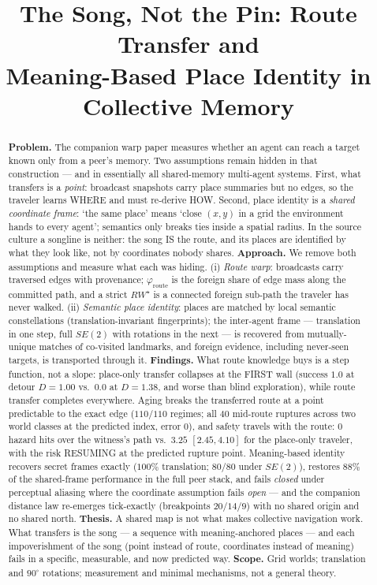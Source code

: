 \documentclass{article}
\title{The Song, Not the Pin: Route Transfer and\\Meaning-Based Place Identity in Collective Memory}
\newcommand{\rwstar}{RW^{\star}}
\newcommand{\phiroute}{\varphi_{\mathrm{route}}}
\begin{document}
\maketitle

\begin{abstract}
\textbf{Problem.} The companion warp paper measures whether an agent can reach a target known only from a peer's memory. Two assumptions remain hidden in that construction --- and in essentially all shared-memory multi-agent systems. First, what transfers is a \emph{point}: broadcast snapshots carry place summaries but no edges, so the traveler learns WHERE and must re-derive HOW. Second, place identity is a \emph{shared coordinate frame}: `the same place' means `close $(x,y)$ in a grid the environment hands to every agent'; semantics only breaks ties inside a spatial radius. In the source culture a songline is neither: the song IS the route, and its places are identified by what they look like, not by coordinates nobody shares.
\textbf{Approach.} We remove both assumptions and measure what each was hiding. (i) \emph{Route warp}: broadcasts carry traversed edges with provenance; $\phiroute$ is the foreign share of edge mass along the committed path, and a strict $\rwstar$ is a connected foreign sub-path the traveler has never walked. (ii) \emph{Semantic place identity}: places are matched by local semantic constellations (translation-invariant fingerprints); the inter-agent frame --- translation in one step, full $SE(2)$ with rotations in the next --- is recovered from mutually-unique matches of co-visited landmarks, and foreign evidence, including never-seen targets, is transported through it.
\textbf{Findings.} What route knowledge buys is a step function, not a slope: place-only transfer collapses at the FIRST wall (success $1.0$ at detour $D{=}1.00$ vs.\ $0.0$ at $D{=}1.38$, and worse than blind exploration), while route transfer completes everywhere. Aging breaks the transferred route at a point predictable to the exact edge ($110/110$ regimes; all $40$ mid-route ruptures across two world classes at the predicted index, error $0$), and safety travels with the route: $0$ hazard hits over the witness's path vs.\ $3.25$ $[2.45,4.10]$ for the place-only traveler, with the risk RESUMING at the predicted rupture point. Meaning-based identity recovers secret frames exactly ($100\%$ translation; $80/80$ under $SE(2)$), restores $88\%$ of the shared-frame performance in the full peer stack, and fails \emph{closed} under perceptual aliasing where the coordinate assumption fails \emph{open} --- and the companion distance law re-emerges tick-exactly (breakpoints $20/14/9$) with no shared origin and no shared north.
\textbf{Thesis.} A shared map is not what makes collective navigation work. What transfers is the song --- a sequence with meaning-anchored places --- and each impoverishment of the song (point instead of route, coordinates instead of meaning) fails in a specific, measurable, and now predicted way.
\textbf{Scope.} Grid worlds; translation and $90^\circ$ rotations; measurement and minimal mechanisms, not a general theory.
\end{abstract}
\end{document}
